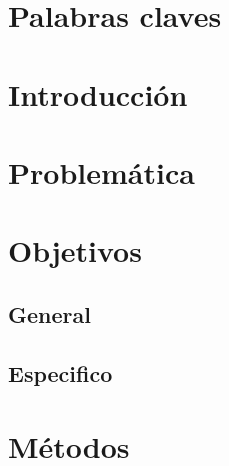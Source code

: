\documentclass[a4paper,10pt]{article}
\begin{document}
\section{Palabras claves}

\section{Introducción}

\section{Problemática}

\section{Objetivos}

\subsection{General}

\subsection{Especifico}


\section{Métodos}

\end{document}
